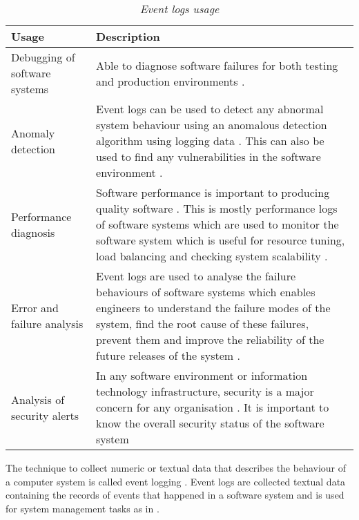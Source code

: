 \begin{table}[!htb]
	\centering
	\small
	\caption[Event logs usage]
	{\textit{Event logs usage}}
	\label{tbl:CH1_EventLogsUsage}
	\begin{tabularx}{\textwidth}{|l|X|}
		\hline \textbf{Usage} & \textbf{Description} \\
		\hline Debugging of software systems & Able to diagnose software failures for both testing and production environments \cite{Rong2018a}.\\
		\hline Anomaly detection & Event logs can be used to detect any abnormal system behaviour using an anomalous detection algorithm using logging data \cite{Gurumdimma2016}. This can also be used to find any vulnerabilities in the software environment \cite{Dwyer2013}. \\
		\hline Performance diagnosis & Software performance is important to producing quality software \cite{EvangelinGeetha2007,Baccanico2014}. This is mostly performance logs of software systems which are used to monitor the software system which is useful for resource tuning, load balancing and checking system scalability \cite{Song2017}. \\ 
		\hline Error and failure analysis & Event logs are used to analyse the failure behaviours of software systems which enables engineers to understand the failure modes of the system, find the root cause of these failures, prevent them and improve the reliability of the future releases of the system \cite{Cinque2013}.\\
		\hline Analysis of security alerts & In any software environment or information technology infrastructure, security is a major concern for any organisation \cite{Pathan2014, Dwyer2013}. It is important to know the overall security status of the software system \\
		\hline
	\end{tabularx}
\end{table}

The technique to collect numeric or textual data that describes the behaviour of a computer system is called event logging \cite{Pecchia2015, Baccanico2014}. Event logs are collected textual data containing the records of events that happened in a software system and is used for system management tasks as in  \cite{Rong2018a, Rong2018, Baccanico2014}.

